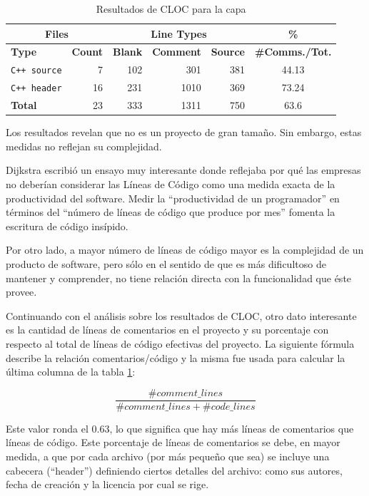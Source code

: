 \begin{table}[!htf]
    \begin{center}
    \begin{tabular}{|l|r|r|r|r|c|}
    \hline
    \multicolumn{2}{|c|}{Files} & \multicolumn{3}{|c|}{Line Types} & \hspace{0.2cm}\% \\
    \hline
    \textbf{Type} & \textbf{Count} & \textbf{Blank} & \textbf{Comment} & \textbf{Source} & \small{\textbf{\#Comms./Tot.}}\\
    \hline
    \texttt{C++ source} & 7   &    102  &     301   &    381 & 44.13 \\
    \hline
    \texttt{C++ header} & 16   &    231  &    1010   &    369 &  73.24 \\
    \hline
    \textbf{Total}      &  23  &     333 &     1311  &    750 & 63.6 \\
    \hline
    \end{tabular}
    \caption{Resultados de CLOC para la capa \rc}
    \label{cloc_recabs}
    \end{center}
\end{table}

Los resultados revelan que \rc{} no es un proyecto de gran tamaño. Sin embargo, estas medidas no reflejan su complejidad.

Dijkstra escribió un ensayo muy interesante\cite{ewd1036} donde reflejaba por qué las empresas no deberían considerar las Líneas de Código
como una medida exacta de la productividad del software. Medir la ``productividad de un programador'' en términos del ``número de líneas de
código que produce por mes'' fomenta la escritura de código insípido.

Por otro lado, a mayor número de líneas de código mayor es la complejidad de un producto de software, pero sólo en el sentido de que es
más dificultoso de mantener y comprender, no tiene relación directa con la funcionalidad que éste provee.

Continuando con el análisis sobre los resultados de CLOC, otro dato interesante es la cantidad de líneas de comentarios en el proyecto y su
porcentaje con respecto al total de líneas de código efectivas del proyecto. La siguiente fórmula describe la relación comentarios/código y
la misma fue usada para calcular la última columna de la tabla \ref{cloc_recabs}:

$$\frac{\#comment\_lines}{\#comment\_lines + \#code\_lines}$$

Este valor ronda el 0.63, lo que significa que hay más líneas de comentarios que líneas de código. Este porcentaje de líneas de comentarios
se debe, en mayor medida, a que por cada archivo (por más pequeño que sea) se incluye una cabecera (``header'') definiendo ciertos detalles
del archivo: como sus autores, fecha de creación y la licencia por cual se rige.

